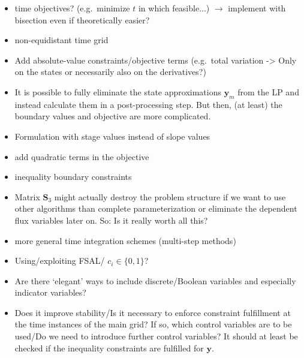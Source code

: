 \documentclass{article}
\newcommand{\vectorfont}[1]{\boldsymbol{#1}}%
\newcommand{\matrixfont}[1]{\mathbf{#1}}%
\newcommand{\yvec}{\vectorfont{y}}
\newcommand{\Smat}{\matrixfont{S}}
\begin{document}
\begin{itemize}
  \item time objectives? (e.g.\ minimize $t$ in which feasible...) $\to$ implement with bisection even if theoretically easier? 
	\item non-equidistant time grid
	\item Add absolute-value constraints/objective terms (e.g.\ total variation -> Only on the states or necessarily also on the derivatives?)
	\item It is possible to fully eliminate the state approximations $\yvec_{m}$ from the LP and instead calculate them in a post-processing step.
	But then, (at least) the boundary values and objective are more complicated.
	\item Formulation with stage values instead of slope values
	\item add quadratic terms in the objective
	\item inequality boundary constraints
	\item Matrix $\Smat_3$ might actually destroy the problem structure if we want to use other algorithms than complete parameterization or eliminate the dependent flux variables later on. So: Is it really worth all this?
	\item more general time integration schemes (multi-step methods)
	\item Using/exploiting FSAL/ $c_i \in \lbrace 0,1\rbrace$?
	\item Are there `elegant' ways to include discrete/Boolean variables and especially indicator variables?
	\item Does it improve stability/Is it necessary to enforce constraint fulfillment at the time instances of the main grid? If so, which control variables are to be used/Do we need to introduce further control variables?
	It should at least be checked if the inequality constraints are fulfilled for $\yvec$.
\end{itemize}
\end{document}
